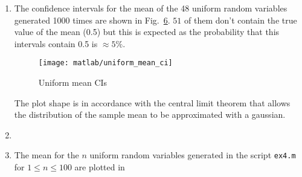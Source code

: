 \documentclass{article}
\newcommand{\inlinecode}[1]{\lstinline[basicstyle=\ttfamily,keywordstyle={}]{#1}}
\begin{document}
\begin{enumerate}
    Fig.~\ref{diff_plots}. In the box plot there is also the mean with
    its 95\% confidence interval.
    \begin{figure}[htbp]
    \centering
    \texttt{[image: matlab/diff\_plots]}
    \caption{Difference}
    \label{diff_plots}
    \end{figure}
    Figure 2.8 is replicated in Fig.~\ref{cis_plot}
    \begin{figure}[htbp]
    \centering
    \texttt{[image: matlab/cis\_plot]}
    \caption{Confidence intervals calculated assuming normal data, in
      the general case and using bootstrap}
    \label{cis_plot}
    \end{figure}
In Fig.~\ref{joe_data} the timeseries of figure 2.10 is plotted, its
autocorrelation is shown in Fig.~\ref{joe_autocorr} and the lag plots
for a lag between 1 and 9 are shown in Fig.~\ref{joe_lagplot}.
    \begin{figure}[htbp]
      \centering
      \texttt{[image: matlab/joe\_data]}
    \caption{Data}
    \label{joe_data}
    \end{figure}
    \begin{figure}[htbp]
      \centering
      \texttt{[image: matlab/joe\_autocorr]}
      \caption{Autocorrelation}
    \label{joe_autocorr}
    \end{figure}
    \begin{figure}[htbp]
      \centering
      \texttt{[image: matlab/lagplot]}
    \caption{Lag plot}
    \label{joe_lagplot}
    \end{figure}      
\item The confidence intervals for the mean of the 48 uniform random
  variables generated 1000 times are shown in
  Fig.~\ref{uniform_mean_ci}. $51$ of them don't contain the true
  value of the mean (0.5) but this is expected as the probability that
  this intervals contain 0.5 is $\approx 5\%$.
  \begin{figure}[htbp]
    \centering
    \texttt{[image: matlab/uniform\_mean\_ci]}
    \caption{Uniform mean CIs}
    \label{uniform_mean_ci}
  \end{figure}
  The plot shape is in accordance with the central limit theorem that
  allows the distribution of the sample mean to be approximated with a
  gaussian.
\item
\item The mean for the $n$ uniform random variables generated in the
  script \inlinecode{ex4.m} for $ 1 \leq n \leq 100 $ are plotted in

\end{enumerate}
\end{document}
